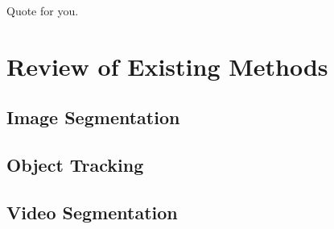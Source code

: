 \begin{savequote}[75mm]
Quote for you.
\end{savequote}

\chapter{Review of Existing Methods}
\section{Image Segmentation}
\section{Object Tracking}
\section{Video Segmentation}




